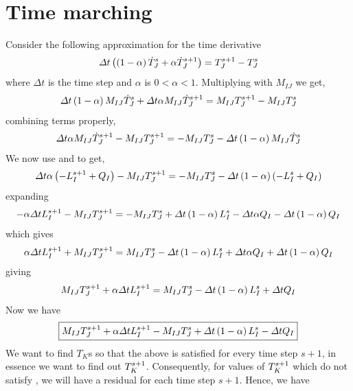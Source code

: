 \documentclass[preprint,12pt]{elsarticle}
\numberwithin{equation}{section}
\begin{document}
\section{Time marching}
Consider the following approximation for the time derivative
\begin{equation}
	\Delta t \left( \left(1-\alpha \right)\dot{T}_J^{s} + \alpha \dot{T}_J^{s+1} \right) = T_J^{s+1} - T_J^{s}\label{scheme}
\end{equation}
where $\Delta t$ is the time step and $\alpha$ is  $0<\alpha<1$. Multiplying  with $M_{IJ}$ we get, 
\begin{equation}
  	\Delta t \left(1-\alpha \right) M_{IJ}\dot{T}_J^{s} + 	\Delta t \alpha M_{IJ}\dot{T}_J^{s+1}  = M_{IJ}T_J^{s+1} - M_{IJ}T_J^{s}\label{scheme1}
\end{equation}
combining terms properly,
\begin{equation}
	 	\Delta t \alpha M_{IJ}\dot{T}_J^{s+1} - M_{IJ}T_J^{s+1}  =  - M_{IJ}T_J^{s} - \Delta t \left(1-\alpha \right) M_{IJ}\dot{T}_J^{s} \label{scheme2}
\end{equation}
We now use  and  to get, 
\begin{equation}
	\Delta t \alpha \left( -L_I^{s+1}+Q_I \right) - M_{IJ}T_J^{s+1}  =  - M_{IJ}T_J^{s} - \Delta t \left(1-\alpha \right) \left( -L_I^s+Q_I\right) \label{scheme3}
\end{equation}
expanding
\begin{equation}
	- \alpha \Delta t L_I^{s+1} -M_{IJ}T_{J}^{s+1} = -M_{IJ}T_{J}^s + \Delta t \left( 1-\alpha \right) L_I^s-\Delta t \alpha Q_I -\Delta t \left(1-\alpha \right) Q_I
\end{equation}
which gives
\begin{equation}
	 \alpha \Delta t L_I^{s+1} + M_{IJ}T_{J}^{s+1} = M_{IJ}T_{J}^s - \Delta t \left( 1-\alpha \right) L_I^s+\Delta t \alpha Q_I +\Delta t \left(1-\alpha \right) Q_I
\end{equation}
giving
\begin{equation}
 M_{IJ}T_{J}^{s+1} +	\alpha \Delta t L_I^{s+1}  = M_{IJ}T_{J}^s - \Delta t \left( 1-\alpha \right) L_I^s+ \Delta t Q_I
\end{equation}
Now we have
\begin{equation}
	\boxed{
		M_{IJ}T_{J}^{s+1} +	\alpha \Delta t L_I^{s+1}  - M_{IJ}T_{J}^s + \Delta t \left( 1-\alpha \right) L_I^s - \Delta t Q_I
	}
	\label{eq:finaleq0}
\end{equation}
We want to find $T_K$s so that the above  is satisfied for every time step $s+1$, in essence we want to find out $T_K^{s+1}$. Consequently, for values of $T_K^{s+1}$ which do not satisfy , we will have a residual for each time step $s+1$. Hence, we have 
\end{document}
